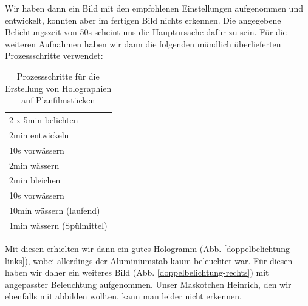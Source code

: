 Wir haben dann ein Bild mit den empfohlenen Einstellungen \cite{versuchsanleitung} aufgenommen und entwickelt, konnten aber im fertigen Bild nichts erkennen. Die angegebene Belichtungszeit von 50s scheint uns die Hauptursache dafür zu sein. Für die weiteren Aufnahmen haben wir dann die folgenden mündlich überlieferten Prozessschritte \cite{lena_christian} verwendet:
\begin{center}
\begin{table}[H]
\centering
\begin{tabular}{l}
 \toprule
 2 x 5min belichten\\
 2min entwickeln\\
 10s vorwässern\\
 2min wässern\\
 2min bleichen\\
 10s vorwässern\\
 10min wässern (laufend)\\
 1min wässern (Spülmittel) \\
 \bottomrule 
\end{tabular}
\caption{Prozessschritte für die Erstellung von Holographien auf Planfilmstücken}
\end{table}
\end{center}

Mit diesen erhielten wir dann ein gutes Hologramm (Abb. \ref{doppelbelichtung-links}), wobei allerdings der Aluminiumstab kaum beleuchtet war. Für diesen haben wir daher ein weiteres Bild (Abb. \ref{doppelbelichtung-rechts}) mit angepasster Beleuchtung aufgenommen. Unser Maskotchen Heinrich, den wir ebenfalls mit abbilden wollten, kann man leider nicht erkennen. 

